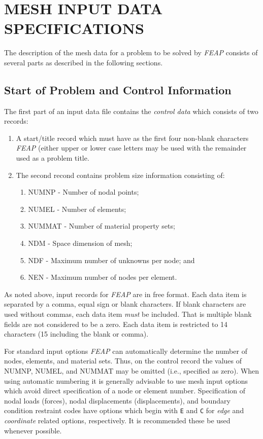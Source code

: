 \chapter[Mesh Input Data]{MESH INPUT DATA SPECIFICATIONS}
\label{meshin}

The description of the mesh data for a problem to be solved by {\sl FEAP}
consists of several parts as described in the following sections.

\section{Start of Problem and Control Information}
\label{start}

The first part of an input data file contains the {\it control data}
which consists of two records:
\begin{enumerate}
\item
A start/title record which must have as the
first four non-blank characters {\sl FEAP} (either upper or lower case letters
may be used with the remainder used as a problem title.
\item
The second recond contains
problem size information consisting of:
\begin{enumerate}
\item NUMNP - Number of nodal points;
\item NUMEL - Number of elements;
\item NUMMAT - Number of material property sets;
\item NDM - Space dimension of mesh;
\item NDF - Maximum number of unknowns per node; and
\item NEN - Maximum number of nodes per element.
\end{enumerate}
\end{enumerate}
As noted above,
input records for {\sl FEAP} are in free format.  Each data item
is separated by a comma, equal sign or blank characters.
If blank characters are used without commas, each data item {\it must} be
included.  That is multiple blank fields are not considered to be a zero.
Each data item is restricted to 14 characters (15 including the blank or
comma).

For standard input options
{\sl FEAP} can automatically determine the number of nodes,
elements, and material sets.  Thus, on the control record the values of NUMNP,
NUMEL, and NUMMAT may be omitted (i.e., specified as zero).  When using
automatic numbering it is generally advisable to use mesh input options
which avoid direct specification of a node or element number.  Specification
of nodal loads (forces), nodal displacements (displacements), and boundary
condition restraint codes have options which begin with {\tt E} and {\tt C}
for {\it edge} and {\it coordinate} related options, respectively.
It is recommended these be used whenever possible.

